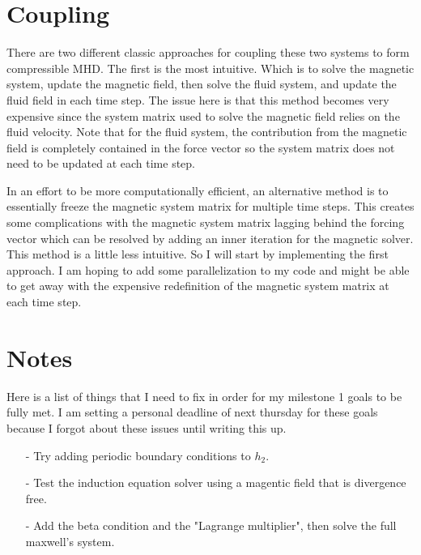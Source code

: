 \documentclass{article}
\begin{document}
\section*{Coupling}
There are two different classic approaches for coupling these two systems to form compressible MHD. The first is the most intuitive. Which is to solve the magnetic system, update the magnetic field, then solve the fluid system, and update the fluid field in each time step. The issue here is that this method becomes very expensive since the system matrix used to solve the magnetic field relies on the fluid velocity. Note that for the fluid system, the contribution from the magnetic field is completely contained in the force vector so the system matrix does not need to be updated at each time step. 

In an effort to be more computationally efficient, an alternative method is to essentially freeze the magnetic system matrix for multiple time steps. This creates some complications with the magnetic system matrix lagging behind the forcing vector which can be resolved by adding an inner iteration for the magnetic solver. This method is a little less intuitive. So I will start by implementing the first approach. I am hoping to add some parallelization to my code and might be able to get away with the expensive redefinition of the magnetic system matrix at each time step. 

\section*{Notes}
Here is a list of things that I need to fix in order for my milestone 1 goals to be fully met. I am setting a personal deadline of next thursday for these goals because I forgot about these issues until writing this up. 
\begin{itemize}
    \item[-] Try adding periodic boundary conditions to $h_2$.
    \item[-] Test the induction equation solver using a magentic field that is divergence free.
    \item[-] Add the beta condition and the "Lagrange multiplier", then solve the full maxwell's system.
\end{itemize}
\end{document}
